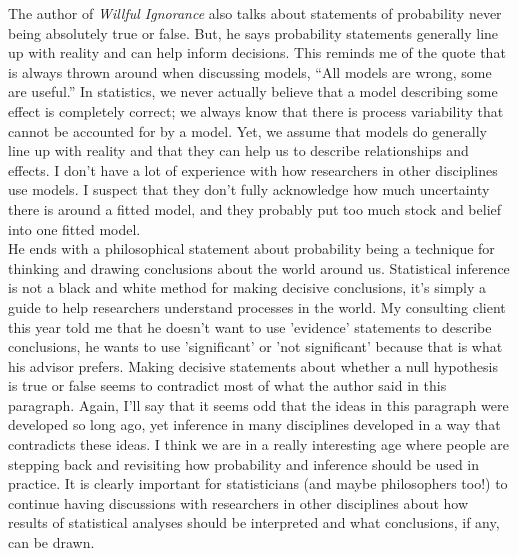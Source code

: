\documentclass[12pt]{article}\usepackage[]{graphicx}\usepackage[]{color}
\begin{document}
\begin{doublespacing}
\noindent The author of {\it Willful Ignorance} also talks about statements of probability never being absolutely true or false. But, he says probability statements generally line up with reality and can help inform decisions. This reminds me of the quote that is always thrown around when discussing models, ``All models are wrong, some are useful.'' In statistics, we never actually believe that a model describing some effect is completely correct; we always know that there is process variability that cannot be accounted for by a model. Yet, we assume that models do generally line up with reality and that they can help us to describe relationships and effects. I don't have a lot of experience with how researchers in other disciplines use models. I suspect that they don't fully acknowledge how much uncertainty there is around a fitted model, and they probably put too much stock and belief into one fitted model.\\

\noindent He ends with a philosophical statement about probability being a technique for thinking and drawing conclusions about the world around us. Statistical inference is not a black and white method for making decisive conclusions, it's simply a guide to help researchers understand processes in the world. My consulting client this year told me that he doesn't want to use 'evidence' statements to describe conclusions, he wants to use 'significant' or 'not significant' because that is what his advisor prefers. Making decisive statements about whether a null hypothesis is true or false seems to contradict most of what the author said in this paragraph. Again, I'll say that it seems odd that the ideas in this paragraph were developed so long ago, yet inference in many disciplines developed in a way that contradicts these ideas. I think we are in a really interesting age where people are stepping back and revisiting how probability and inference should be used in practice. It is clearly important for statisticians (and maybe philosophers too!) to continue having discussions with researchers in other disciplines about how results of statistical analyses should be interpreted and what conclusions, if any, can be drawn. \\

\end{doublespacing}
\vspace{0.5in}
\end{document}
